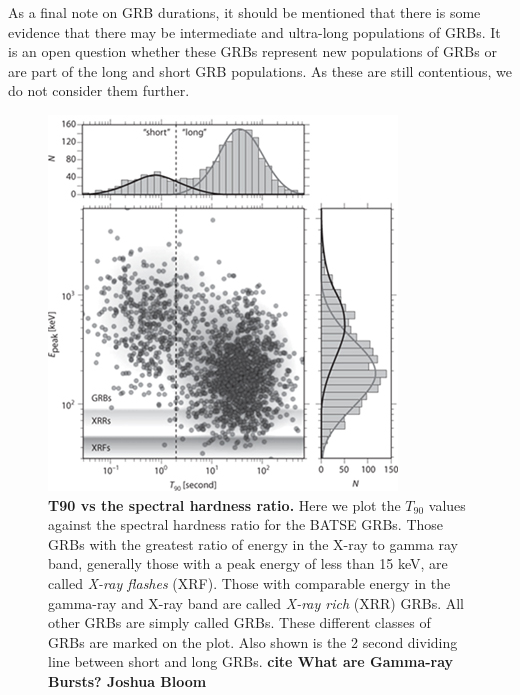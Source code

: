 \documentclass[11pt]{cuthesis}
\begin{document}
As a final note on GRB durations, it should be mentioned that there is some evidence that there may be intermediate and ultra-long populations of GRBs. It is an open question whether these GRBs represent new populations of GRBs or are part of the long and short GRB populations. As these are still contentious, we do not consider them further. 




\begin{figure} %
\begin{center}
\includegraphics[width=0.8\linewidth]{t90_vs_hardness_new.jpg}
\end{center}
\caption{\textbf{T90 vs the spectral hardness ratio.} Here we plot the $T_{90}$ values against the spectral hardness ratio for the BATSE GRBs. Those GRBs with the greatest ratio of energy in the X-ray to gamma ray band, generally those with a peak energy of less than 15 keV, are called \textit{X-ray flashes} (XRF). Those with comparable energy in the gamma-ray and X-ray band are called \textit{X-ray rich} (XRR) GRBs. All other GRBs are simply called GRBs. These different classes of GRBs are marked on the plot. Also shown is the 2 second dividing line between short and long GRBs.  \textbf{cite What are Gamma-ray Bursts? Joshua Bloom}}
\label{fig:t90 vs hardness}
\end{figure}
\end{document}
